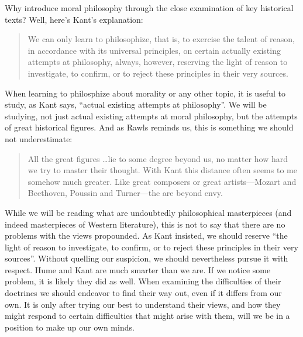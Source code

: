 Why introduce moral philosophy through the close examination of key historical texts? Well, here's Kant's explanation:
\begin{quote}
    We can only learn to philosophize, that is, to exercise the talent of reason, in accordance with its universal principles, on certain actually existing attempts at philosophy, always, however, reserving the light of reason to investigate, to confirm, or to reject these principles in their very sources.
\end{quote}
When learning to philosphize about morality or any other topic, it is useful to study, as Kant says, ``actual existing attempts at philosophy''. We will be studying, not just actual existing attempts at moral philosophy, but the attempts of great historical figures. And as Rawls reminds us, this is something we should not underestimate:
\begin{quote}
    All the great figures \ldots lie to some degree beyond us, no matter how hard we try to master their thought. With Kant this distance often seems to me somehow much greater. Like great composers or great artists---Mozart and Beethoven, Poussin and Turner---the are beyond envy.
\end{quote}
While we will be reading what are undoubtedly philosophical masterpieces (and indeed masterpieces of Western literature), this is not to say that there are no problems with the views propounded. As Kant insisted, we should reserve ``the light of reason to investigate, to confirm, or to reject these principles in their very sources''. Without quelling our suspicion, we should nevertheless pursue it with respect. Hume and Kant are much smarter than we are. If we notice some problem, it is likely they did as well. When examining the difficulties of their doctrines we should endeavor to find their way out, even if it differs from our own. It is only after trying our best to understand their views, and how they might respond to certain difficulties that might arise with them, will we be in a position to make up our own minds. \change

% 

